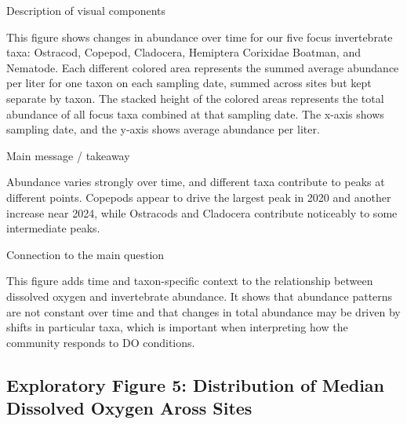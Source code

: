 \documentclass[
  letterpaper,
  DIV=11,
  numbers=noendperiod]{scrartcl}
\begin{document}
Description of visual components

This figure shows changes in abundance over time for our five focus
invertebrate taxa: Ostracod, Copepod, Cladocera, Hemiptera Corixidae
Boatman, and Nematode. Each different colored area represents the summed
average abundance per liter for one taxon on each sampling date, summed
across sites but kept separate by taxon. The stacked height of the
colored areas represents the total abundance of all focus taxa combined
at that sampling date. The x-axis shows sampling date, and the y-axis
shows average abundance per liter.

Main message / takeaway

Abundance varies strongly over time, and different taxa contribute to
peaks at different points. Copepods appear to drive the largest peak in
2020 and another increase near 2024, while Ostracods and Cladocera
contribute noticeably to some intermediate peaks.

Connection to the main question

This figure adds time and taxon-specific context to the relationship
between dissolved oxygen and invertebrate abundance. It shows that
abundance patterns are not constant over time and that changes in total
abundance may be driven by shifts in particular taxa, which is important
when interpreting how the community responds to DO conditions.

\subsection{Exploratory Figure 5: Distribution of Median Dissolved
Oxygen Aross
Sites}\label{exploratory-figure-5-distribution-of-median-dissolved-oxygen-aross-sites}
\end{document}
